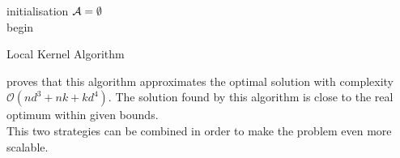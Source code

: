 \begin{algorithm}[h]
 initialisation\;
 $\mathcal{A} = \emptyset$ \\
 begin\;
\caption{Local Kernel Algorithm}
\label{alg:local}
\end{algorithm} 


\citet{krause_near-optimal_2008} proves that this algorithm approximates the optimal solution with complexity $\mathcal{O}(nd^3 + nk + kd^4)$. The solution found by this algorithm is close to the real optimum within given bounds. \\

This two strategies can be combined in order to make the problem even more scalable. 
